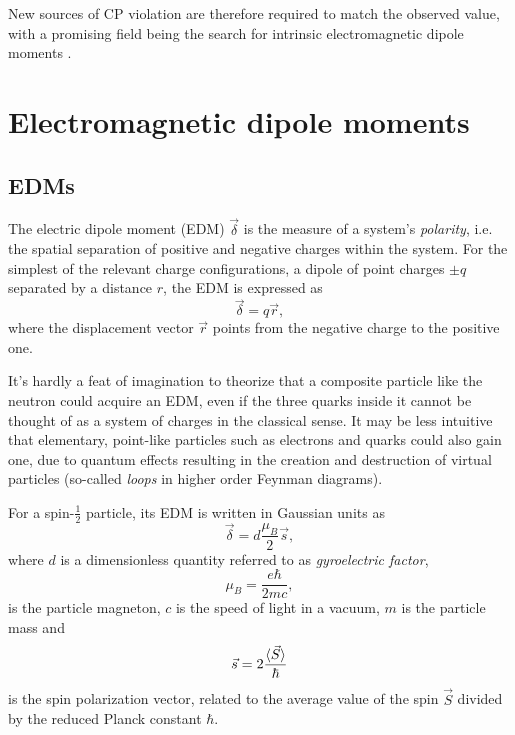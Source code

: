 New sources of CP violation are therefore required to match the observed value, with a promising field being the search for intrinsic electromagnetic dipole moments \cite{cpvws}.

\section{Electromagnetic dipole moments}
\label{sec:emdms}

\subsection{EDMs}
The electric dipole moment (EDM) $\vec{\delta}$ is the measure of a system's \textit{polarity}, i.e. the spatial separation of positive and negative charges within the system.
For the simplest of the relevant charge configurations, a dipole of point charges $\pm q$ separated by a distance $r$, the EDM is expressed as
\begin{equation}
	\vec{\delta} = q \vec{r},
\end{equation}
where the displacement vector $\vec{r}$ points from the negative charge to the positive one.

It's hardly a feat of imagination to theorize that a composite particle like the neutron could acquire an EDM, even if the three quarks inside it cannot be thought of as a system of charges in the classical sense.
It may be less intuitive that elementary, point-like particles such as electrons and quarks could also gain one, due to quantum effects resulting in the creation and destruction of virtual particles (so-called \textit{loops} in higher order Feynman diagrams).

For a spin-$\frac{1}{2}$ particle, its EDM is written in Gaussian units as \cite{searchNewPhysics}
\begin{equation}
\vec{\delta} = d \frac{\mu_B}{2} \vec{s},
\end{equation}
where $d$ is a dimensionless quantity referred to as \textit{gyroelectric factor},
\begin{equation}
\mu_B = \frac{e\hbar}{2mc},
\label{eq:magneton}
\end{equation}
is the particle magneton, $c$ is the speed of light in a vacuum, $m$ is the particle mass and
\begin{equation}
\vec{s} = 2 \frac{\braket{\vec{S}}}{\hbar}
\label{eq:spin-polarization-vector}
\end{equation}
is the spin polarization vector, related to the average value of the spin $\vec{S}$ divided by the reduced Planck constant $\hbar$.

